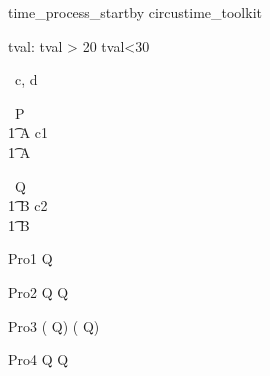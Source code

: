 \begin{zsection}
   \SECTION time\_process\_startby \parents circustime\_toolkit
\end{zsection}


\begin{axdef}
   tval: \nat
\where
   tval > 20 \land tval<30
\end{axdef}



\begin{circus}
   \circchannel\ c, d \\
\end{circus}



\begin{circus}
    \circprocess\ P \circdef  \circbegin  \\
    \t1 A \circdef c1 \then \Skip \\
    \t1 \circspot A \\
    \circend
\end{circus}



\begin{circus}
    \circprocess\ Q \circdef  \circbegin  \\
    \t1 B \circdef c2 \then \Skip \\
    \t1 \circspot B \\
    \circend
\end{circus}


\begin{circus}
    \circprocess Pro1 \circdef  {} \rcirctime \circstartby Q \\
\end{circus}

\begin{circus}
    \circprocess Pro2 \circdef {} \rcirctime \circstartby Q \circseq {} \rcirctime \circstartby Q \\
\end{circus}
    
\begin{circus}
    \circprocess Pro3 \circdef (  \rcirctime \circstartby Q) \circseq (  \rcirctime \circstartby Q) \\
\end{circus}
    
\begin{circus}
    \circprocess Pro4 \circdef {} \rcirctime \circstartby Q \extchoice  {} \rcirctime \circstartby Q \\ 
\end{circus}
    
